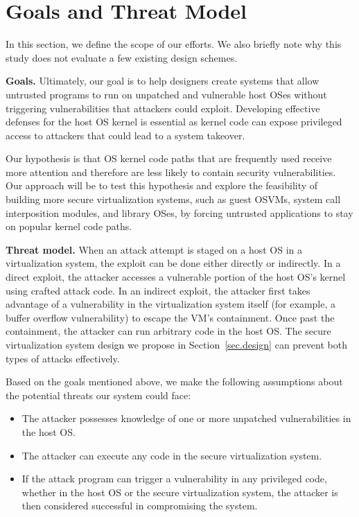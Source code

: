 \section{Goals and Threat Model}
\label{sec.motivation-and-background}

In this section, we define the scope of our efforts. We also briefly note why
this study does not evaluate a few existing design schemes.

\noindent
\textbf{Goals.}
Ultimately, our goal is to help designers
create systems that allow untrusted programs to
run on unpatched and vulnerable host OSes without triggering vulnerabilities that
attackers could exploit.
Developing effective defenses for the host OS kernel is essential as kernel code
can expose privileged access to attackers that could lead to a system takeover.

Our hypothesis is that OS kernel code paths that are frequently used receive
more attention and therefore are less likely to contain security
vulnerabilities. Our approach will be to test this hypothesis and explore the
feasibility of building more secure virtualization systems, such as guest OSVMs, system
call interposition modules, and library OSes, by forcing untrusted applications
to stay on popular kernel code paths.



\noindent
\textbf{Threat model.}
When an attack attempt is staged
on a host OS in a virtualization system,
the exploit can be done either directly or indirectly.
In a direct exploit, the attacker accesses a vulnerable portion of the host OS's kernel
using crafted attack code. In an indirect exploit,
the attacker first takes advantage of a vulnerability in the virtualization system itself
(for example, a buffer overflow vulnerability)
to escape the VM's containment. Once past the containment, the attacker can run arbitrary code
in the host OS.
The secure virtualization system design we propose
in Section~\ref{sec.design} can prevent both types of attacks effectively.

Based on the goals mentioned above, we make the following assumptions about the
potential threats our system could face:

\begin{itemize}\setlength\itemsep{0em}

\item The attacker possesses knowledge of one or more unpatched
vulnerabilities in the host OS.

\item The attacker can execute any code in the secure
virtualization system.

\item If the attack program can trigger a vulnerability in any privileged
code, whether in the host OS or the secure virtualization system, the attacker
is then considered successful in compromising the system.

\end{itemize}

